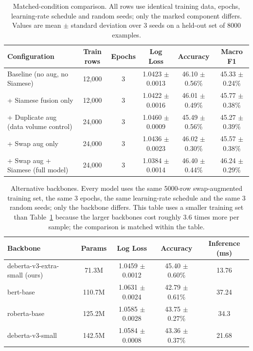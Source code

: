 \begin{table}[!htbp]\centering
\caption{Matched-condition comparison. All rows use identical training data, epochs, learning-rate schedule and random seeds; only the marked component differs. Values are mean $\pm$ standard deviation over 3 seeds on a held-out set of 8000 examples.}
\label{tab:main_results}
\begin{tabular}{@{}lccccc@{}}\toprule
\textbf{Configuration} & \textbf{Train rows} & \textbf{Epochs} & \textbf{Log Loss} & \textbf{Accuracy} & \textbf{Macro F1} \\ \midrule
Baseline (no aug, no Siamese) & 12,000 & 3 & 1.0423 $\pm$ 0.0013 & 46.10 $\pm$ 0.56\% & 45.33 $\pm$ 0.24\% \\
+ Siamese fusion only & 12,000 & 3 & 1.0422 $\pm$ 0.0016 & 46.01 $\pm$ 0.49\% & 45.77 $\pm$ 0.38\% \\
+ Duplicate aug (data volume control) & 24,000 & 3 & 1.0460 $\pm$ 0.0009 & 45.49 $\pm$ 0.56\% & 45.27 $\pm$ 0.39\% \\
+ Swap aug only & 24,000 & 3 & 1.0436 $\pm$ 0.0023 & 46.02 $\pm$ 0.30\% & 45.57 $\pm$ 0.38\% \\
+ Swap aug + Siamese (full model) & 24,000 & 3 & 1.0384 $\pm$ 0.0014 & 46.40 $\pm$ 0.44\% & 46.24 $\pm$ 0.29\% \\
\bottomrule\end{tabular}\end{table}

\begin{table}[!htbp]\centering
\caption{Alternative backbones. Every model uses the same 5000-row swap-augmented training set, the same 3 epochs, the same learning-rate schedule and the same 3 random seeds; only the backbone differs. This table uses a smaller training set than Table~\ref{tab:main_results} because the larger backbones cost roughly 3.6 times more per sample; the comparison is matched within the table.}
\label{tab:comparison}
\begin{tabular}{@{}lcccc@{}}\toprule
\textbf{Backbone} & \textbf{Params} & \textbf{Log Loss} & \textbf{Accuracy} & \textbf{Inference (ms)} \\ \midrule
deberta-v3-extra-small (ours) & 71.3M & 1.0459 $\pm$ 0.0012 & 45.40 $\pm$ 0.60\% & 13.76 \\
bert-base & 110.7M & 1.0631 $\pm$ 0.0024 & 42.79 $\pm$ 0.61\% & 37.24 \\
roberta-base & 125.2M & 1.0585 $\pm$ 0.0028 & 43.75 $\pm$ 0.27\% & 34.3 \\
deberta-v3-small & 142.5M & 1.0584 $\pm$ 0.0008 & 43.36 $\pm$ 0.37\% & 21.68 \\
\bottomrule\end{tabular}\end{table}


